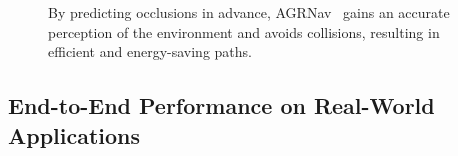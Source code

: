 \begin{figure}[!t]
    \centering

    \caption{By predicting occlusions in advance, AGRNav~\cite{agrnav} gains an accurate perception of the environment and avoids collisions, resulting in efficient and energy-saving paths.}
    \label{fig:agrnav}
\end{figure}


\subsection{End-to-End Performance on Real-World Applications}

